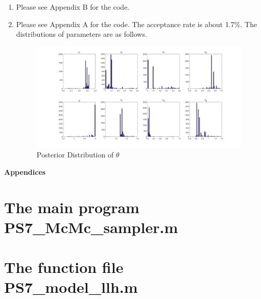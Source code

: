 \documentclass[12pt]{article}
\begin{document}
\begin{enumerate}
\begin{itemize}
\end{itemize}
\item Please see Appendix B for the code.
\item Please see Appendix A for the code.
The acceptance rate is about 1.7\%. The distributions of parameters are as follows.
\begin{figure}
\centerline{\includegraphics[scale=.38]{PosteriorDistribution.jpg}}
\caption{Posterior Distribution of $\theta$}
\end{figure}
\end{enumerate}

\Large {\bf Appendices}
\appendix
\section{The main program PS7\_McMc\_sampler.m}

\section{The function file PS7\_model\_llh.m}

\restoregeometry
\end{document}
